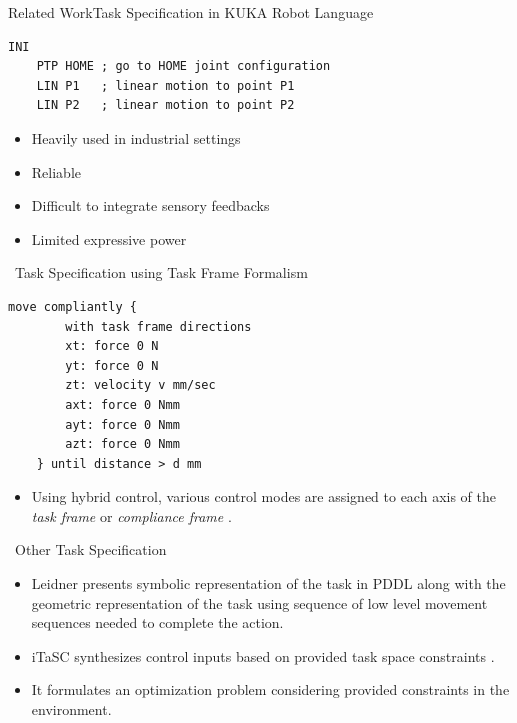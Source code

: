 \documentclass[aspectratio=43,10pt,fleqn,t]{beamer}
\begin{document}
\begin{frame}[fragile]{Related Work}{\small Task Specification in KUKA Robot Language}
	
	\begin{lstlisting}[label=KRL-sample,caption=KRL code]
    INI
    PTP HOME ; go to HOME joint configuration
    LIN P1   ; linear motion to point P1
    LIN P2   ; linear motion to point P2
\end{lstlisting}
	\begin{itemize}
		\item Heavily used in industrial settings 
		\item Reliable
		\item Difficult to integrate sensory feedbacks
		\item Limited expressive power \cite{leidner2017cognitive}
	\end{itemize}
\end{frame}


\begin{frame}[fragile]{~}{Task Specification using Task Frame Formalism \cite{mason1981compliance}}
	
	\begin{lstlisting}[label=tff,caption=Task Specification using TFF: Open Door]
    move compliantly {
        with task frame directions
        xt: force 0 N
        yt: force 0 N
        zt: velocity v mm/sec
        axt: force 0 Nmm
        ayt: force 0 Nmm
        azt: force 0 Nmm
    } until distance > d mm
    \end{lstlisting}
	
	\begin{itemize}
		\item Using hybrid control, various control modes are assigned to each axis of the \textit{task frame} or \textit{compliance frame} \cite{nagele2018prototype}. 
	\end{itemize}
\end{frame}

\begin{frame}[fragile]{~}{Other Task Specification \cite{leidner2017cognitive}}
	\begin{itemize}
		\item Leidner presents symbolic representation of the task in PDDL along with the geometric representation of the task using sequence of low level movement sequences needed to complete the action. 
		\item iTaSC synthesizes control inputs based on provided task space constraints \cite{DeSchutter-ijrr2007, DecreBruyninckxDeSchutter2013, decre09}. 
		\item It formulates an optimization problem considering provided constraints in the environment. 
 
	\end{itemize}
\end{frame}
\end{document}
